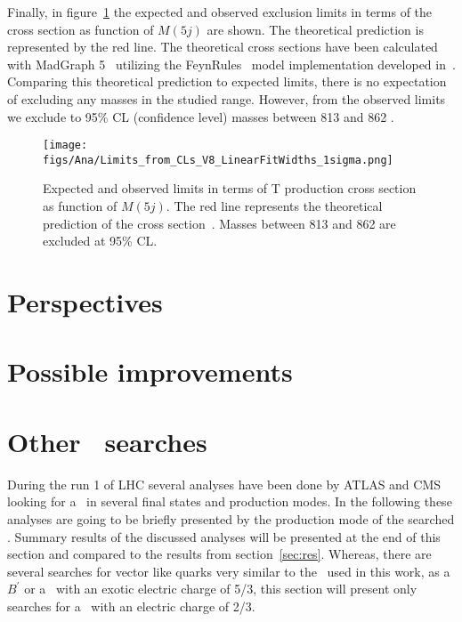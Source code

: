 Finally, in figure~\ref{fig:Lim} the expected and observed exclusion limits in terms of the cross section as function of $M(5j)$ are shown. The theoretical prediction is represented by the red line. The theoretical cross sections have been calculated with MadGraph 5~\cite{Alwall:2014hca, Alwall:2011uj} utilizing the FeynRules~\cite{Alloul:2013bka} model implementation developed in~\cite{Buchkremer:2013bha, Cacciapaglia:2011fx}. Comparing this theoretical prediction to expected limits, there is no expectation of excluding any masses in the studied range. However, from the observed limits we exclude to 95\% CL (confidence level) masses between 813 and 862 \GeVcc.

\begin{figure}[!Hhtbp]
  \begin{center}
    \texttt{[image: figs/Ana/Limits\_from\_CLs\_V8\_LinearFitWidths\_1sigma.png]}
    \caption{Expected and observed limits in terms of T production cross section as function of $M(5j)$. The red line represents the theoretical prediction of the cross section~\cite{Buchkremer:2013bha, Cacciapaglia:2011fx}. Masses between 813 and 862 \GeVcc are excluded at 95\% CL.}
    \label{fig:Lim}
  \end{center}
\end{figure}

\section{Perspectives}
\label{sec:pers}



\section{Possible improvements}
\label{sec:impro}



\section{Other \Tp~searches}
\label{sec:art}

During the run 1 of LHC several analyses have been done by ATLAS and CMS looking for a \Tp~in several final states and production modes. In the following these analyses are going to be briefly presented by the production mode of the searched \Tp. Summary results of the discussed analyses will be presented at the end of this section and compared to the results from section~\ref{sec:res}. Whereas, there are several searches for vector like quarks very similar to the \Tp~used in this work, as a $B^{'}$ or a \Tp~with an exotic electric charge of 5/3, this section will present only searches for a \Tp~with an electric charge of 2/3.

